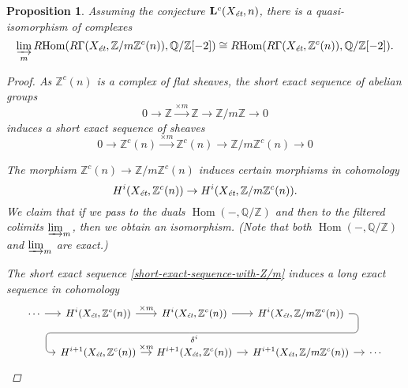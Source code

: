 \documentclass{article}
\DeclareMathOperator{\Hom}{Hom}
\newcommand{\QQ}{\mathbb{Q}}
\newcommand{\ZZ}{\mathbb{Z}}
\newcommand{\et}{\text{\it ét}}
\newcommand{\RHom}{R\!\Hom}
\newtheorem{proposition}[theorem]{Proposition}
\theoremstyle{definition}
\numberwithin{equation}{section}
\begin{document}
\begin{proposition}
  \label{prop:a-quasi-isomorphism-with-dirlim}
  Assuming the conjecture $\mathbf{L}^c (X_\et, n)$, there is
  a quasi-isomorphism of complexes
  \[ \varinjlim_m \RHom (R\Gamma (X_\et, \ZZ/m\ZZ^c (n)), \QQ/\ZZ [-2]) \cong
  \RHom (R\Gamma (X_\et, \ZZ^c (n)), \QQ/\ZZ [-2]). \]

  \begin{proof}
    As $\ZZ^c (n)$ is a complex of flat sheaves, the short exact sequence of
    abelian groups
    $$0 \to \ZZ \xrightarrow{\times m} \ZZ \to \ZZ/m\ZZ \to 0$$
    induces a short exact sequence of sheaves
    \begin{equation}
      \label{short-exact-sequence-with-Z/m}
      0 \to \ZZ^c (n) \xrightarrow{\times m} \ZZ^c (n) \to \ZZ/m\ZZ^c (n) \to 0
    \end{equation}

    The morphism $\ZZ^c (n) \to \ZZ/m\ZZ^c (n)$ induces certain morphisms in
    cohomology
    $$H^i (X_\et, \ZZ^c (n)) \to H^i (X_\et, \ZZ/m\ZZ^c (n)).$$
    We claim that if we pass to the duals $\Hom (-, \QQ/\ZZ)$ and then to the
    filtered colimits $\varinjlim_m$, then we obtain an isomorphism.
    (Note that both $\Hom (-, \QQ/\ZZ)$ and $\varinjlim_m$ are exact.)

    The short exact sequence \eqref{short-exact-sequence-with-Z/m} induces
    a long exact sequence in cohomology
    \[ \begin{tikzcd}[column sep=1em,font=\small]
      \cdots\ar{r} & H^i (X_\et, \ZZ^c (n)) \ar{r}{\times m} & H^i (X_\et, \ZZ^c (n))\ar{r} \ar[draw=none]{d}[name=X, anchor=center]{} & H^i (X_\et, \ZZ/m\ZZ^c (n)) \ar[rounded corners,to path={ -- ([xshift=2ex]\tikztostart.east) |- (X.center) \tikztonodes -| ([xshift=-2ex]\tikztotarget.west) -- (\tikztotarget)}]{dll}[at end]{\delta^i} \\
      & H^{i+1} (X_\et, \ZZ^c (n)) \ar{r}{\times m} & H^{i+1} (X_\et, \ZZ^c (n))\ar{r} & H^{i+1} (X_\et, \ZZ/m\ZZ^c (n)) \ar{r} & \cdots
    \end{tikzcd} \]


\end{proof}
\end{proposition}
\end{document}
